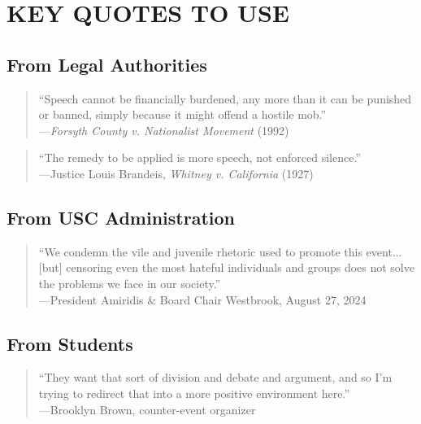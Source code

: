 \documentclass[11pt,letterpaper]{article}
\begin{document}
\section{KEY QUOTES TO USE}

\subsection{From Legal Authorities}

\begin{quote}
``Speech cannot be financially burdened, any more than it can be punished or banned, simply because it might offend a hostile mob.''\\
---\textit{Forsyth County v. Nationalist Movement} (1992)
\end{quote}

\begin{quote}
``The remedy to be applied is more speech, not enforced silence.''\\
---Justice Louis Brandeis, \textit{Whitney v. California} (1927)
\end{quote}

\subsection{From USC Administration}

\begin{quote}
``We condemn the vile and juvenile rhetoric used to promote this event... [but] censoring even the most hateful individuals and groups does not solve the problems we face in our society.''\\
---President Amiridis \& Board Chair Westbrook, August 27, 2024
\end{quote}

\subsection{From Students}

\begin{quote}
``They want that sort of division and debate and argument, and so I'm trying to redirect that into a more positive environment here.''\\
---Brooklyn Brown, counter-event organizer
\end{quote}
\end{document}
